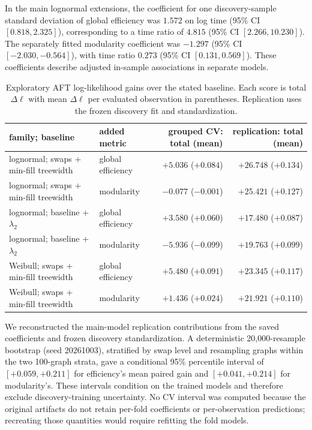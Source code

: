 \documentclass[11pt]{article}
\begin{document}
In the main lognormal extensions, the coefficient for one discovery-sample standard deviation of global efficiency was $1.572$ on log time (95\% CI $[0.818,2.325]$), corresponding to a time ratio of $4.815$ (95\% CI $[2.266,10.230]$). The separately fitted modularity coefficient was $-1.297$ (95\% CI $[-2.030,-0.564]$), with time ratio $0.273$ (95\% CI $[0.131,0.569]$). These coefficients describe adjusted in-sample associations in separate models.

\begin{table}[H]
\centering
\scriptsize
\caption{Exploratory AFT log-likelihood gains over the stated baseline. Each score is total $\Delta\ell$ with mean $\Delta\ell$ per evaluated observation in parentheses. Replication uses the frozen discovery fit and standardization.}
\label{tab:aft}
\begin{tabular}{llrr}
\toprule
family; baseline & added metric & grouped CV: total (mean) & replication: total (mean)\\
\midrule
lognormal; swaps + min-fill treewidth & global efficiency & $+5.036$ ($+0.084$) & $+26.748$ ($+0.134$)\\
lognormal; swaps + min-fill treewidth & modularity & $-0.077$ ($-0.001$) & $+25.421$ ($+0.127$)\\
lognormal; baseline + $\lambda_2$ & global efficiency & $+3.580$ ($+0.060$) & $+17.480$ ($+0.087$)\\
lognormal; baseline + $\lambda_2$ & modularity & $-5.936$ ($-0.099$) & $+19.763$ ($+0.099$)\\
Weibull; swaps + min-fill treewidth & global efficiency & $+5.480$ ($+0.091$) & $+23.345$ ($+0.117$)\\
Weibull; swaps + min-fill treewidth & modularity & $+1.436$ ($+0.024$) & $+21.921$ ($+0.110$)\\
\bottomrule
\end{tabular}
\end{table}

We reconstructed the main-model replication contributions from the saved coefficients and frozen discovery standardization. A deterministic 20,000-resample bootstrap (seed 20261003), stratified by swap level and resampling graphs within the two 100-graph strata, gave a conditional 95\% percentile interval of $[+0.059,+0.211]$ for efficiency's mean paired gain and $[+0.041,+0.214]$ for modularity's. These intervals condition on the trained models and therefore exclude discovery-training uncertainty. No CV interval was computed because the original artifacts do not retain per-fold coefficients or per-observation predictions; recreating those quantities would require refitting the fold models.
\end{document}
